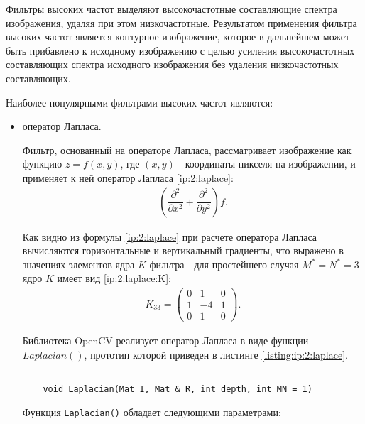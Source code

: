 
Фильтры высоких частот выделяют высокочастотные составляющие спектра изображения, удаляя при этом низкочастотные. Результатом применения фильтра высоких частот является контурное изображение, которое в дальнейшем может быть прибавлено к исходному изображению с целью усиления высокочастотных составляющих спектра исходного изображения без удаления низкочастотных составляющих.

Наиболее популярными фильтрами высоких частот являются:

\begin{itemize}

	\item оператор Лапласа.

	Фильтр, основанный на операторе Лапласа, рассматривает изображение как функцию $z = f(x, y)$, где $(x, y)$ - координаты пикселя на изображении, и применяет к ней оператор Лапласа \eqref{ip:2:laplace}:
	\begin{gather}
		\label{ip:2:laplace}
		\left(\dfrac{\partial ^ 2}{\partial x ^ 2} + \dfrac{\partial ^ 2}{\partial y ^ 2}\right) f.
	\end{gather}

	Как видно из формулы \eqref{ip:2:laplace} при расчете оператора Лапласа вычисляются горизонтальные и вертикальный градиенты, что выражено в значениях элементов ядра $K$ фильтра - для простейшего случая $M^* = N^* = 3$ ядро $K$ имеет вид \eqref{ip:2:laplace:K}:
	\begin{gather}
		\label{ip:2:laplace:K}
		K_{33} = \left(
		\begin{array}{ccc}
			0 & 1 & 0 \\
			1 & -4 & 1 \\
			0 & 1 & 0
		\end{array}
		\right).
	\end{gather}

	Библиотека OpenCV реализует оператор Лапласа в виде функции $Laplacian()$, прототип которой приведен в листинге \ref{listing:ip:2:laplace}.
	\begin{lstlisting}

	void Laplacian(Mat I, Mat & R, int depth, int MN = 1)

	\end{lstlisting}
	\mylistingend

	Функция \verb|Laplacian()| обладает следующими параметрами:
	

\end{itemize}
